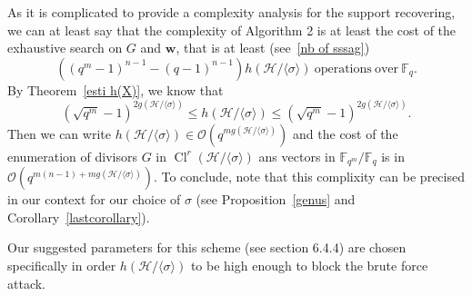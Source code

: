 \documentclass[10pt]{article}
\theoremstyle{definition}
\theoremstyle{definition}
\theoremstyle{definition}
\newcommand{\s}{\vspace{0.3cm}}
\newcommand{\calH}{\mathcal{H}}
\newcommand{\fqm}{\mathbb{F}_{q^m}}
\newcommand{\fq}{\mathbb{F}_q}
\newcommand{\Cl}{\operatorname{Cl}}
\begin{document}
\s

As it is complicated to provide a complexity analysis for the support recovering, we can at least say that the complexity of Algorithm 2 is at least the cost of the exhaustive search on $G$ and $\mathbf{w}$, that is at least (see~\eqref{nb of sssag})
\[ ((q^m-1)^{n-1}-(q-1)^{n-1})h(\mathcal{H}/\langle \sigma \rangle) \ \mathrm{operations  \ over} \ \fq.\]
By Theorem~\ref{esti h(X)}, we know that 
\[(\sqrt{q^m}-1)^{2g(\mathcal{H}/\langle \sigma \rangle)} \leq h(\mathcal{H}/\langle \sigma \rangle) \leq (\sqrt{q^m}-1)^{2g(\mathcal{H}/\langle \sigma \rangle)}.\] 
Then we can write $h(\mathcal{H}/\langle \sigma \rangle) \in \mathcal{O}(q^{mg(\mathcal{H}/\langle \sigma \rangle)})$ and the cost of the enumeration of divisors $G$ in $\Cl^r(\mathcal{H}/\langle \sigma \rangle)$ ans vectors in $\fqm/\fq$ is in $\mathcal{O}(q^{m(n-1)+mg(\mathcal{H}/\langle \sigma \rangle)})$. 
To conclude, note that this complixity can be precised in our context for our choice of $\sigma$ (see Proposition~\ref{genus} and Corollary~\ref{lastcorollary}).

Our suggested parameters for this scheme (see section 6.4.4) are chosen specifically in order $h(\calH/\langle \sigma \rangle)$ to be high enough to block the brute force attack.










\newpage


\end{document}
